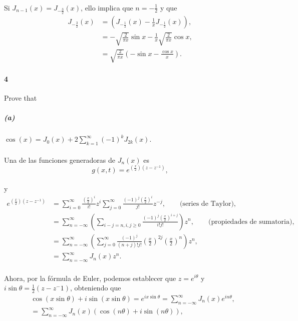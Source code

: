 \documentclass{article}
\begin{document}
\paragraph{}Si $J_{n-1}(x) = J_{-\frac{3}{2}}(x)$, ello implica que $n=-\frac{1}{2}$ y que
\begin{align*}
J_{-\frac{3}{2}}(x) &= \left(J_{-\frac{1}{2}}(x) - \frac{1}{x} J_{-\frac{1}{2}}(x)\right),\\
&= -\sqrt{\frac{2}{\pi x}} \sin {x} - \frac{1}{x} \sqrt{\frac{2}{\pi x}} \cos{x},\\
&= \sqrt{\frac{2}{\pi x}} \left(-\sin{x} - \frac{\cos{x}}{x}\right).
\end{align*} 
\paragraph{4} Prove that
\subparagraph{(a)} $\cos{(x)} = J_0(x) + 2 \sum_{k=1}^{\infty} (-1)^k J_{2k}(x)$.
\paragraph{} Una de las funciones generadoras de $J_n(x)$ es 
\begin{equation}
g(x,t) = e^{\left(\frac{x}{2}\right)(z - z^{-1})}\label{eq:prop_4a1},
\end{equation}
\paragraph{} y
\begin{align*}
e^{\left(\frac{x}{2}\right)(z - z^{-1})} &= \sum_{i=0}^{\infty} \frac{\left(\frac{x}{2}\right)^i}{i!}z^i \sum_{j=0}^{\infty} \frac{(-1)^j \left(\frac{x}{2}\right)^i}{j!} z^{-j}, \hspace{20pt}\text{ (series de Taylor),}\\
&= \sum_{n=-\infty}^{\infty} \left(\sum_{i-j=n, i,j\geq 0} \frac{(-1)^j \left(\frac{x}{2}\right)^{i+j}}{i!j!}\right)z^n, \hspace{20pt} \text{ (propiedades de sumatoria),}\\
&= \sum_{n=-\infty}^{\infty} \left(\sum_{j=0}^{\infty} \frac{(-1)^j}{(n+j)!j!} \left(\frac{x}{2}\right)^{2j} \left(\frac{x}{2}\right)^n\right)z^n,\\
&= \sum_{n=-\infty}^{\infty} J_n(x) z^n.
\end{align*}
\paragraph{} Ahora, por la fórmula de Euler, podemos establecer que $z = e^{i\theta}$ y $i\sin{\theta} = \frac{1}{2} (z - z^-1)$, obteniendo que
\begin{align*}
& \cos{(x\sin{\theta})} + i\sin{(x\sin{\theta})} = e^{ix\sin{\theta}} = \sum_{n=-\infty}^{\infty} J_n(x)e^{in\theta},\\
&= \sum_{n=-\infty}^{\infty} J_n(x)(\cos{(n\theta)} + i \sin{(n\theta)}),
\end{align*}
\end{document}
